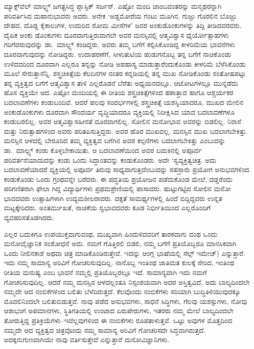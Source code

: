 ಮ್ಯಾಕ್ಸ್​ವೆಲ್ ಮಾಲ್ಟ್ಸ್ ಜಗತ್ಪ್ರಸಿದ್ಧ ಪ್ಲಾಸ್ಟಿಕ್ ಸರ್ಜನ್. ಎಷ್ಟೋ ಮಂದಿ ಜಾಂಬವಂತರನ್ನು ಮನ್ಮಥರನ್ನಾಗಿ ಪರಿವರ್ತಿಸಿದ ಮಹಾನುಭಾವರು ಅವರು. ಅನೇಕ ‘ಅಡ್ಡಮೋರೆಯ ಗಂಟು ಮೂಗಿನ, ಗುಜ್ಜು ಗೊರಲಿನ ಬೊಜ್ಜು ದೇಹದ, ದೊಡ್ಡ ಕೈಕಾಲುಗಳ, ಉದುರಿದ ರೋಮ ಮೀಸೆಗಳ’ ಜನರ ಅಂಕುಡೊಂಕುಗಳನ್ನು ತಿದ್ದಿ ತೀಡಿದವರವರು. ದೈಹಿಕ ಅಂಕು ಡೊಂಕುಗಳು ದೂರವಾಗುತ್ತಿರುವಾಗಲೇ ಅವರ ಮನಸ್ಸಿನಲ್ಲಿ ಆತ್ಮವಿಶ್ವಾಸ ಧೈರ್ಯೋತ್ಸಾಹಗಳು ಗರಿಗೆದರುವುದನ್ನು ಡಾ.\ ಮಾಲ್ಟ್ಸ್ ಕಂಡಿದ್ದರು. ಅವರು ತಮ್ಮ ಬಗೆಗೆ ಕಲ್ಪಿಸಿಕೊಂಡಿದ್ದ ಕೀಳರಿಮೆಯ ಭಾವನೆಗಳು ದೂರವಾಗುವುದನ್ನು ನೋಡಿದ್ದರು. ಉದಾಹರಣೆಗೆ, ಸೀಳುತುಟಿಯ ಹುಡುಗನೊಬ್ಬ ತನ್ನ ಬಗೆಗೆ ನಾಚಿಕೊಂಡು ಉಳಿದವರಿಂದ ದೂರವಾಗಿ ಎಲ್ಲರೂ ತನ್ನನ್ನು ನೋಡಿ ಅಪಹಾಸ್ಯ ಮಾಡುತ್ತಾರೆಂದುಕೊಂಡು ಕೀಳರಿಮೆ ಬೆಳೆಸಿಕೊಂಡು ಮೂಲೆ ಸೇರುತ್ತಾನೆನ್ನಿ. ಶಸ್ತ್ರಚಿಕಿತ್ಸೆಯ ಕೆಲದಿನಗಳ ನಂತರ ಕನ್ನಡಿಯಲ್ಲಿ ತನ್ನ ಮುಖ ನೋಡಿಕೊಂಡು ಸಂತೋಷಪಟ್ಟು ತನ್ನ ವ್ಯಕ್ತಿತ್ವದ ಬಗೆಗೆ ಆತ್ಮವಿಶ್ವಾಸ ತಾಳಿ ಎಲ್ಲರೊಡನೆ ಬೆರೆತು ಅಧ್ಯಯನದಲ್ಲೂ, ಆಟೋಟಗಳಲ್ಲೂ ಮುನ್ನಡೆದು ಹೊಸ ವ್ಯಕ್ತಿಯೇ ಆದ. ಎಷ್ಟೋ ಮಂದಿಯಲ್ಲಿ ಈ ರೀತಿಯ ಶಸ್ತ್ರಚಿಕಿತ್ಸೆಗಳಿಂದ ಹಠಾತ್ತಾದ ಹಾಗೂ ಆಶ್ಚರ್ಯಕರ ಬದಲಾವಣೆಗಳು ಕಂಡುಬಂದಿವೆ. ಆದರೆ ಹಲವು ಸಂದರ್ಭಗಳಲ್ಲಿ ಶಸ್ತ್ರಚಿಕಿತ್ಸೆ ಯಶಸ್ವಿಯಾದರೂ, ಮುಖದ ಮೇಲಿನ ಅಂಕುಡೊಂಕುಗಳು ದೂರವಾಗಿ ಸೌಂದರ್ಯ ವೃದ್ಧಿಯಾದರೂ ವ್ಯಕ್ತಿಯಲ್ಲಿ ನಿರೀಕ್ಷಿಸಿದ ಯಾವ ಬದಲಾವಣೆಗಳೂ ಕಂಡುಬರಲಿಲ್ಲ. ಅವರ ಆತ್ಮವಿಶ್ವಾಸಹೀನತೆ ದೂರವಾಗಲಿಲ್ಲ. ಸೋಲಿನ ಮನೋಭಾವ ಅವರನ್ನು ಬಿಡಲಿಲ್ಲ. ನಿರಾಸೆ ಮತ್ತು ನಿರುತ್ಸಾಹಗಳಿಂದ ಅವರು ಪರಿತಪಿಸುತ್ತಿದ್ದರು. ಅವರ ಹೊರ ಮುಖವಲ್ಲ, ಮನಸ್ಸಿನ ಮುಖ ಬದಲಾಗಬೇಕಿತ್ತು. ಮನಸ್ಸಿನ ಆಳದಲ್ಲಿ ಬೇರೂರಿದ ತಮ್ಮ ವ್ಯಕ್ತಿತ್ವದ ಬಗೆಗಿನ ಅವರ ಕಲ್ಪನೆಗಳು ಬದಲಾಗಬೇಕಿತ್ತು ಎಂಬುದನ್ನು ಡಾ.\ ಮಾಲ್ಟ್ಸ್ ಕಂಡು ಕೊಳ್ಳಬೇಕಾಯಿತು. ಆ ಬದಲಾವಣೆಯಿಂದ ಅವರ ಬದುಕಿನಲ್ಲಿ ಅಪೂರ್ವ ಪರಿವರ್ತನೆಯಾದುದನ್ನು ಕಂಡು ಒಂದು ಸಿದ್ಧಾಂತವನ್ನು ಕಂಡುಕೊಂಡರು. ಅದೇ ‘ಸ್ವವ್ಯಕ್ತಿತ್ವಚಿತ್ರ. ಅದು ಬದಲಾವಣೆಯಾದರೆ ವ್ಯಕ್ತಿಯಲ್ಲಿ ಅಪೂರ್ವ ತಿರುವು ಸಾಧ್ಯವಾಗುತ್ತದೆಂಬುದನ್ನು ಸಹಸ್ರಾರು ಪ್ರಯೋಗ ಅನುಭವಗಳಿಂದ ಕಂಡುಕೊಂಡು ಒಂದು ಗ್ರಂಥವನ್ನೇ ಬರೆದರು. ಈ ಪದ್ಧತಿಯ ಪ್ರಯೋಜನ ಪಡೆದುಕೊಂಡ ಮೇಲೆ, ದಡ್ಡರೆಂದು ಪರಿಗಣಿತರಾಗಿ ಫೇಲಾ ಗಿದ್ದ ವಿದ್ಯಾರ್ಥಿಗಳು ಪ್ರಥಮಶ್ರೇಣಿಯಲ್ಲಿ ಪಾಸಾದರು. ಹುಟ್ಟುಗಟ್ಟಿದ ಸೋಲಿನ ಮನೋ ಭಾವದವರು ಉತ್ಸಾಹಿಗಳಾಗಿ ಉದ್ಯಮಶೀಲರಾದರು. ದಕ್ಷತೆ ಸಾಮರ್ಥ್ಯಗಳಲ್ಲಿ ಹಿಂದೆ ಬಿದ್ದಿದ್ದವರು ಉನ್ನತ ಮಟ್ಟಕ್ಕೇರಿದರು. ಅಂತರ್ಮುಖತೆ, ನಾಚಿಕೆಯ ಸ್ವಭಾವದವರು ಕೂಡ ನಿರ್ಭೀತಿಯಿಂದ ಎಲ್ಲರೊಂದಿಗೆ ವ್ಯವಹರಿಸತೊಡಗಿದರು.

ಎಲ್ಲರ ಬದುಕಿಗೂ ಉಪಯುಕ್ತವಾಗುವಂಥ, ಮುಖ್ಯವಾಗಿ ಹಿಂದುಳಿದವರಿಗೆ ತಾರಕವಾಗು ವಂಥ ಒಂದು ಮನೋವೈಜ್ಞಾನಿಕ ಸಂಶೋಧನೆ ಅದು. ನಮಗೆ ಗೊತ್ತಿರಲಿ ಬಿಡಲಿ, ನಮ್ಮ ಬಗೆಗೆ ಪ್ರತಿಯೊಬ್ಬರೂ ಮಾನಸಿಕವಾಗಿ ಒಂದು ನೀಲಿನಕಾಶೆ ಅಥವಾ ಚಿತ್ರ ಮಾಡಿಕೊಂಡಿರುತ್ತೇವೆ. ಇದನ್ನು ಆಂಗ್ಲ ಭಾಷೆಯಲ್ಲಿ ಸೆಲ್ಫ್ ಇಮೇಜ್​) ಎನ್ನುತ್ತಾರೆ. ಇದು ನಮ್ಮ ಸಾಮಾನ್ಯ ಅರಿವಿಗೆ ಗೋಚರಿಸುವುದಿಲ್ಲ. ನಾನೊಬ್ಬ ಇಂತಿಂಥ ಜಾತಿಮತ ಕುಲಕ್ಕೆ ಸೇರಿದ, ಇಂತಿಂಥ ರೀತಿಯ ಮನುಷ್ಯ ಎಂಬ ಭಾವನೆ ನಮ್ಮಲ್ಲಿ ಪ್ರತಿಯೊಬ್ಬರಲ್ಲೂ ಇದೆ. ಸಾಮಾನ್ಯವಾಗಿ ಇದು ನಮಗೆ ಗೋಚರಿಸುವುದಿಲ್ಲ. ಆದರೆ ನಮ್ಮ ಮನಸ್ಸಿನ ಆಳದಲ್ಲಂತೂ ನಿಸ್ಸಂಶಯವಾಗಿ ಅದರ ಅಸ್ತಿತ್ವವಿದೆ. ಅದು ಬಾಲ್ಯದಿಂದಲೇ ನಮ್ಮದೇ ಆದ ನಂಬಿಕೆಗಳಿಂದ ಬಲಿತು ಬೆಳೆದಿರುತ್ತದೆ. ಕೆಲವೊಂದು ನಂಬಿಕೆಗಳು ಸರಿಯಾಗಿ ಬುದ್ಧಿತಿಳಿಯುವುದಕ್ಕೂ ಮೊದಲಿನಿಂದಲೇ ಬಲಿತುಬಿಡುತ್ತವೆ. ನಾವು ಪಡೆದ ಅನುಭವಗಳು, ಸಾಧನೆ ಸಿದ್ಧಿಗಳು, ಗೆಲವು ಯಶಸ್ಸುಗಳು, ನೋವು ಆಶಾಭಂಗ ಅಪಮಾನಗಳು, ಸ್ಥಿತಿಗತಿಯಲ್ಲಿ ಉಂಟಾದ ಏರುಪೇರುಗಳು, ಇತರರು ನಮ್ಮ ಮೇಲೆ ಬಾಲ್ಯದಿಂದಲೇ ತೋರುತ್ತಿದ್ದ ಪ್ರತಿಕ್ರಿಯೆಗಳು–ಇವೆಲ್ಲವುಗಳಿಂದ ಈ ನಂಬಿಕೆಗಳು ರೂಪತಾಳುತ್ತವೆ. ಒಟ್ಟು ಅವುಗಳ ಮೊತ್ತದಿಂದ ನಮ್ಮದೇ ಆದ ವ್ಯಕ್ತಿತ್ವದ ಚಿತ್ರವೊಂದು ನಮ್ಮ ಸಾಮಾನ್ಯ ಅರಿವಿಗೆ ಗೋಚರಿಸದೇ ಸಿದ್ಧವಾಗಿರುತ್ತದೆ. ಅದಕ್ಕನುಗುಣವಾಗಿಯೇ ನಾವು ವರ್ತಿಸುತ್ತೇವೆ ಎನ್ನುತ್ತಾರೆ ಮನೋವಿಜ್ಞಾನಿಗಳು.

